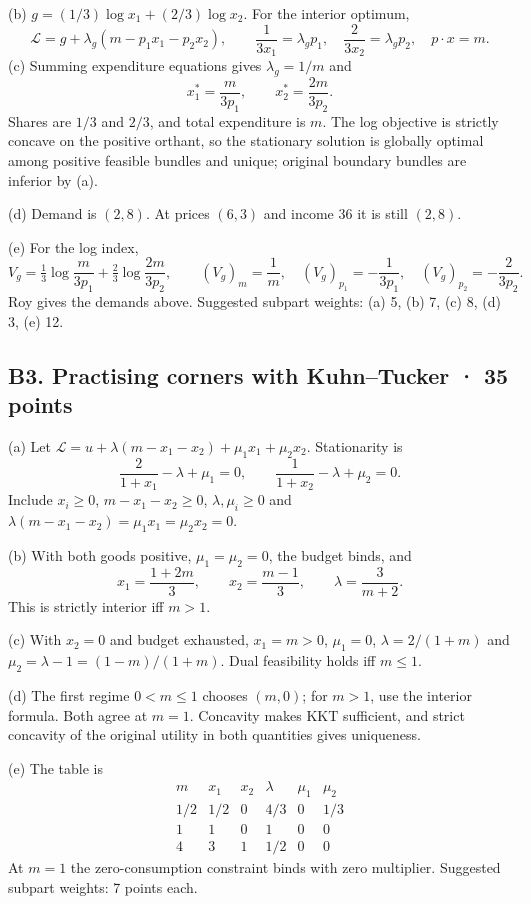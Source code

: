 (b) $g=(1/3)\log x_1+(2/3)\log x_2$. For the interior optimum,
\[
 \mathcal L=g+\lambda_g(m-p_1x_1-p_2x_2),\qquad
 \frac1{3x_1}=\lambda_gp_1,\quad
 \frac2{3x_2}=\lambda_gp_2,\quad p\cdot x=m.
\]
(c) Summing expenditure equations gives $\lambda_g=1/m$ and
\[
 x_1^*=\frac{m}{3p_1},\qquad x_2^*=\frac{2m}{3p_2}.
\]
Shares are $1/3$ and $2/3$, and total expenditure is $m$. The log objective is strictly concave on the positive orthant, so the stationary solution is globally optimal among positive feasible bundles and unique; original boundary bundles are inferior by (a).

(d) Demand is $(2,8)$. At prices $(6,3)$ and income 36 it is still $(2,8)$.

(e) For the log index,
\[
 V_g=\tfrac13\log\frac{m}{3p_1}+\tfrac23\log\frac{2m}{3p_2},\qquad
 (V_g)_m=\frac1m,\quad (V_g)_{p_1}=-\frac1{3p_1},\quad (V_g)_{p_2}=-\frac2{3p_2}.
\]
Roy gives the demands above. Suggested subpart weights: (a) 5, (b) 7, (c) 8, (d) 3, (e) 12.

\subsection*{B3. Practising corners with Kuhn--Tucker · 35 points}
(a) Let $\mathcal L=u+\lambda(m-x_1-x_2)+\mu_1x_1+\mu_2x_2$. Stationarity is
\[
 \frac2{1+x_1}-\lambda+\mu_1=0,\qquad
 \frac1{1+x_2}-\lambda+\mu_2=0.
\]
Include $x_i\ge0$, $m-x_1-x_2\ge0$, $\lambda,\mu_i\ge0$ and $\lambda(m-x_1-x_2)=\mu_1x_1=\mu_2x_2=0$.

(b) With both goods positive, $\mu_1=\mu_2=0$, the budget binds, and
\[
 x_1=\frac{1+2m}{3},\qquad x_2=\frac{m-1}{3},\qquad\lambda=\frac3{m+2}.
\]
This is strictly interior iff $m>1$.

(c) With $x_2=0$ and budget exhausted, $x_1=m>0$, $\mu_1=0$, $\lambda=2/(1+m)$ and $\mu_2=\lambda-1=(1-m)/(1+m)$. Dual feasibility holds iff $m\le1$.

(d) The first regime $0<m\le1$ chooses $(m,0)$; for $m>1$, use the interior formula. Both agree at $m=1$. Concavity makes KKT sufficient, and strict concavity of the original utility in both quantities gives uniqueness.

(e) The table is
\[
 \begin{array}{c|ccccc}
 m&x_1&x_2&\lambda&\mu_1&\mu_2\\\hline
 1/2&1/2&0&4/3&0&1/3\\
 1&1&0&1&0&0\\
 4&3&1&1/2&0&0
 \end{array}
\]
At $m=1$ the zero-consumption constraint binds with zero multiplier. Suggested subpart weights: 7 points each.
